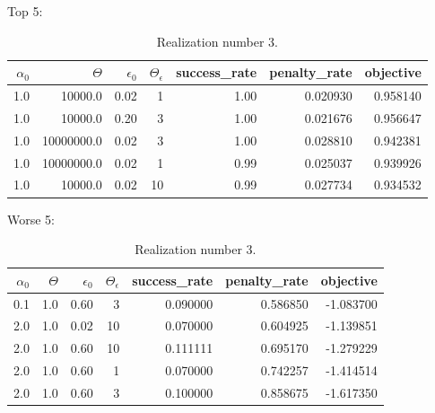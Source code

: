 \documentclass[conference]{IEEEtran}
\begin{document}
\begin{table}
\scriptsize
Top 5: \newline
\begin{tabular}{rrrrrrr}
\hline
$\alpha_0$ &    $\Theta$ &  $\epsilon_0$ &  $\Theta_\epsilon$ &  success\_rate &  penalty\_rate &  objective \\
\hline
     1.0 &     10000.0 &       0.02 &                  1 &          1.00 &      0.020930 &   0.958140 \\
     1.0 &     10000.0 &       0.20 &                  3 &          1.00 &      0.021676 &   0.956647 \\
     1.0 &  10000000.0 &       0.02 &                  3 &          1.00 &      0.028810 &   0.942381 \\
     1.0 &  10000000.0 &       0.02 &                  1 &          0.99 &      0.025037 &   0.939926 \\
     1.0 &     10000.0 &       0.02 &                 10 &          0.99 &      0.027734 &   0.934532 \\
\hline
\end{tabular}

\vspace{1em} Worse 5: \newline
\begin{tabular}{rrrrrrr}
\hline
$\alpha_0$ &    $\Theta$ &  $\epsilon_0$ &  $\Theta_\epsilon$ &  success\_rate &  penalty\_rate &  objective \\
\hline
     0.1 &    1.0 &       0.60 &                  3 &      0.090000 &      0.586850 &  -1.083700 \\
     2.0 &    1.0 &       0.02 &                 10 &      0.070000 &      0.604925 &  -1.139851 \\
     2.0 &    1.0 &       0.60 &                 10 &      0.111111 &      0.695170 &  -1.279229 \\
     2.0 &    1.0 &       0.60 &                  1 &      0.070000 &      0.742257 &  -1.414514 \\
     2.0 &    1.0 &       0.60 &                  3 &      0.100000 &      0.858675 &  -1.617350 \\
\hline
\end{tabular}
\vspace{2em}
\caption{Realization number 3.}
\label{tab:03}
\end{table}
\end{document}
